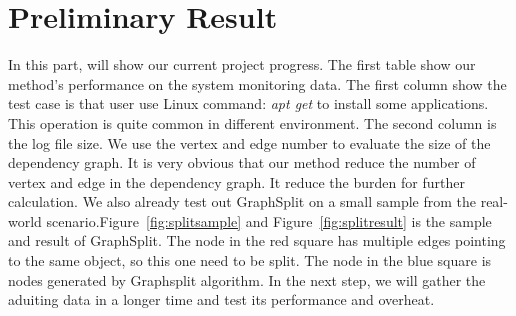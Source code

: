 \section{Preliminary Result}

In this part, will show our current project progress. The first table show our method's performance on the system monitoring data. The first column show the test case is that user use Linux command: \textit{apt get} to install some applications. This operation is quite common in different environment. The second column is the log file size. We use the vertex and edge number to evaluate the size of the dependency graph. It is very obvious that our method reduce the number of vertex and edge in the dependency graph.  It reduce the burden for further calculation. We also already test out GraphSplit on a small sample from the real-world scenario.Figure~\ref{fig:splitsample} and Figure~\ref{fig:splitresult} is the sample and result of GraphSplit. The node in the red square has multiple edges pointing to the same object, so this one need to be split. The node in the blue square is nodes generated by Graphsplit algorithm. In the next step, we will gather the aduiting data in a longer time and test its performance and overheat. 


